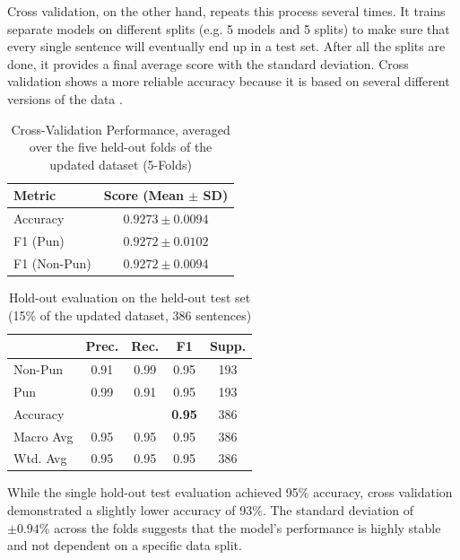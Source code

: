 \documentclass[11pt,a4paper]{article}
\begin{document}
Cross validation, on the other hand, repeats this process several times. It trains separate models on different splits (e.g. 5 models and 5 splits) to make sure that every single sentence will eventually end up in a test set. After all the splits are done, it provides a final average score with the standard deviation. Cross validation shows a more reliable accuracy because it is based on several different versions of the data \citep{geeks_cross_val}.


\begin{table}[h]
\small %
\setlength{\tabcolsep}{4pt} %
\centering
\label{tab:cv_summary}
\begin{tabular}{lc}
\hline
\textbf{Metric} & \textbf{Score (Mean $\pm$ SD)} \\ \hline
Accuracy        & $0.9273 \pm 0.0094$           \\
F1 (Pun)        & $0.9272 \pm 0.0102$           \\
F1 (Non-Pun)    & $0.9272 \pm 0.0094$           \\ \hline
\end{tabular}
\caption{Cross-Validation Performance, averaged over the five held-out folds of the updated dataset (5-Folds)}
\end{table}

\begin{table}[h]
\centering
\small %
\setlength{\tabcolsep}{4pt} %
\begin{tabular}{l|cccc}
\hline
& \textbf{Prec.} & \textbf{Rec.} & \textbf{F1} & \textbf{Supp.} \\ 
\hline
Non-Pun      & 0.91 & 0.99 & 0.95 & 193 \\
Pun          & 0.99 & 0.91 & 0.95 & 193  \\
\hline
Accuracy     &      &      & \textbf{0.95} & 386 \\
Macro Avg    & 0.95 & 0.95 & 0.95 & 386 \\
Wtd. Avg     & 0.95 & 0.95 & 0.95 & 386 \\
\hline
\end{tabular}
\caption{Hold-out evaluation on the held-out test set (15\% of the updated dataset, 386 sentences)}
\label{tab:holdout_final}
\end{table}

While the single hold-out test evaluation achieved 95\% accuracy, cross validation demonstrated a slightly lower accuracy of 93\%. The standard deviation of $\pm 0.94\%$ across the folds suggests that the model's performance is highly stable and not dependent on a specific data split.
\end{document}
